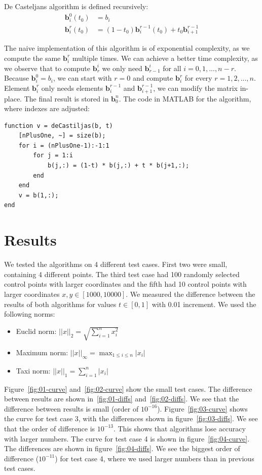 \documentclass[]{article}
\begin{document}
De Casteljans algorithm is defined recursively:
\begin{align*} \textbf{b}^0_i(t_0) &= b_i \\ \textbf{b}^r_i(t_0) &= (1 - t_0)
\textbf{b}^{r-1}_i(t_0) + t_0 \textbf{b}^{r-1}_{i+1}
\end{align*}

The naive implementation of this algorithm is of exponential complexity, as we
compute the same $\textbf{b}_i^r$ multiple times. We can achieve a better time
complexity, as we observe that to compute $\textbf{b}_r^i$ we only need
$\textbf{b}_{r-1}^i$ for all $i = 0, 1, ..., n - r$. Because
$\textbf{b}_i^0 = b_i$, we can start with $r = 0$ and compute $\textbf{b}_i^r$
for every $r = 1, 2, ..., n$. Element $\textbf{b}^r_i$ only needs elements
$\textbf{b}^{r-1}_i$ and $\textbf{b}^{r-1}_{i+1}$, we can modify the matrix
in-place. The final result is stored in $\textbf{b}^n_0$. The code in MATLAB for
the algorithm, where indexes are adjusted:

\begin{lstlisting}
function v = deCastiljas(b, t)
    [nPlusOne, ~] = size(b);
    for i = (nPlusOne-1):-1:1
        for j = 1:i
            b(j,:) = (1-t) * b(j,:) + t * b(j+1,:);
        end
    end
    v = b(1,:);
end
\end{lstlisting}

\section{Results}

We tested the algorithms on 4 different test cases. First two were small,
containing 4 different points. The third test case had 100 randomly selected
control points with larger coordinates and the fifth had 10 control points with
larger coordinates $x, y \in [1000, 10000]$. We measured the difference between
the results of both algorithms for values $t \in [0, 1]$ with 0.01 increment. We
used the following norms:
\begin{itemize}
	\item Euclid norm: $\lvert \lvert x \rvert \rvert_2 = \sqrt{\sum_{i = 1}^{n}
x_i^2}$
	\item Maximum norm: $\lvert \lvert x \rvert \rvert_\infty = \max_{1 \leq i
\leq n} \lvert x_i \rvert$
	\item Taxi norm: $\lvert \lvert x \rvert \rvert_1 = \sum_{i = 1}^{n} \lvert
x_i \rvert$
\end{itemize}

Figure~\ref{fig:01-curve} and~\ref{fig:02-curve} show the small test cases. The
difference between results are shown in~\ref{fig:01-diffs}
and~\ref{fig:02-diffs}. We see that the difference between results is small
(order of $10^{-16}$). Figure~\ref{fig:03-curve} shows the curve for test case
3, with the differences shown in figure~\ref{fig:03-diffs}. We see that the
order of difference is $10^{-13}$. This shows that algorithms lose accuracy with
larger numbers. The curve for test case 4 is shown in
figure~\ref{fig:04-curve}. The differences are shown in
figure~\ref{fig:04-diffs}. We see the biggest order of difference ($10^{-11}$)
for test case 4, where we used larger numbers than in previous test cases.
\end{document}
